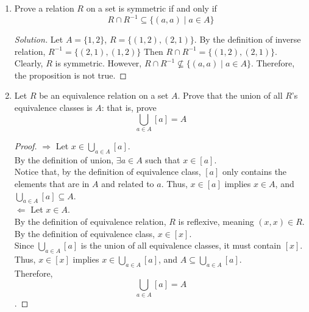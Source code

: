\documentclass[12pt]{article}
\renewcommand\qedsymbol{$\blacksquare$}
\newenvironment{solution}
{\begin{proof}[Solution]\renewcommand\qedsymbol{$\square$}}
	{\end{proof}}
\begin{document}
	\begin{enumerate}
		\item Prove a relation $R$ on a set is symmetric if and only if
		\[R\cap R^{-1}\subseteq \{(a,a)\mid a\in A\}\]
		\begin{solution}
			Let $A = \{1,2\}$, $R = \{(1,2),(2,1)\}$. By the definition of inverse relation, $R^{-1} = \{(2,1),(1,2)\}$ Then $R\cap R^{-1} = \{(1,2),(2,1)\}$. Clearly, $R$ is symmetric. However, $R\cap R^{-1} \not \subseteq \{(a,a)\mid a\in A\}$. Therefore, the proposition is not true.
		\end{solution}
		
		\item Let $R$ be an equivalence relation on a set $A$. Prove that the union of all $R$'s equivalence classes is $A$: that is, prove
		\[\bigcup_{a\in A}[a]=A\]
		\begin{proof}
			$\Rightarrow$ Let $x\in \bigcup_{a\in A}[a]$.\\
			By the definition of union, $\exists a\in A$ such that $x\in [a]$.\\
			Notice that, by the definition of equivalence class, $[a]$ only contains the elements that are in $A$ and related to $a$. Thus, $x\in [a]$ implies $x\in A$, and $\bigcup_{a\in A}[a]\subseteq A$.\\
			$\Leftarrow$ Let $x\in A$.\\
			By the definition of equivalence relation, $R$ is reflexive, meaning $(x,x)\in R$.\\
			By the definition of equivalence class, $x\in [x]$.\\
			Since $\bigcup_{a\in A}[a]$ is the union of all equivalence classes, it must contain $[x]$. Thus, $x\in [x]$ implies $x\in \bigcup_{a\in A}[a]$, and $A\subseteq \bigcup_{a\in A}[a].$\\
			Therefore, \[\bigcup_{a\in A}[a]=A\].
		\end{proof}
		

\end{enumerate}
\end{document}
